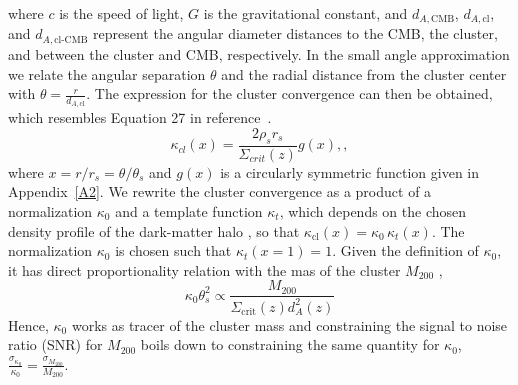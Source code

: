 \documentclass[prd, superscriptaddress, tightenlines, longbibliography, nofootinbib, eqsecnum, amsfonts, amsmath, floatfix, twocolumn, notitlepage]{revtex4-2}
\newcommand{\LL}[1]{{\color{orange}{LL: #1}}}
\begin{document}
where $c$ is the speed of light, $G$ is the gravitational constant, and $d_{A,\text{CMB}}$, $d_{A,\text{cl}}$, and $d_{A,\text{cl-CMB}}$ represent the angular diameter distances to the CMB, the cluster, and between the cluster and CMB, respectively. 
In the small angle approximation we relate the angular separation $\theta$ and the radial distance from the cluster center with $\theta = \frac{r}{d_{A,\text{cl}}}$.
The expression for the cluster convergence can then be obtained, which resembles \LL{what do you mean by ressembles?} Equation 27 in reference~\cite{Takada:2002qq}.
\begin{equation}
    \kappa_{cl} (x) = \frac{2\rho_s r_s}{\Sigma_{crit}(z)}g(x), ,
\end{equation}
where  $x= r / r_s = \theta / \theta_s$ and $g(x)$ is a circularly symmetric function given in Appendix~\ref{A2}. 
We rewrite the cluster convergence as a product of a normalization $\kappa_0$ and a template function $\kappa_t$, which depends on the chosen density profile of the dark-matter halo \LL{and the template depends also on the mass and redshift?}, so that $\kappa_{\text{cl}} (x) = \kappa_0 \, \kappa_t (x)$. 
The normalization $\kappa_0$ is chosen such that $\kappa_t(x=1) = 1$.
Given the definition of $\kappa_0$, it has direct proportionality relation with the mas of the cluster $M_{200}$ \cite{Zubeldia:2019brr},
\begin{equation}\label{eq:tracer}
    \kappa_0 \theta_s^2 \propto \frac{M_{200}}{\Sigma_{\text{crit}}(z)d_{A}^2(z)}
\end{equation}
Hence, $\kappa_0$ works as tracer of the cluster mass and constraining the signal to noise ratio (SNR) for $M_{200}$ boils down to constraining the same quantity for $\kappa_0$, $\displaystyle \frac{\sigma_{\kappa_0}}{\kappa_0} = \frac{\sigma_{M_{200}}}{M_{200}}$. 
\end{document}
